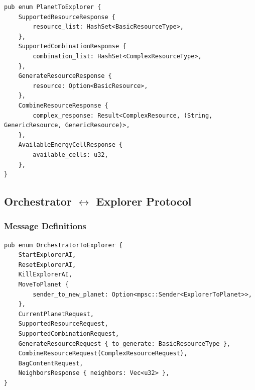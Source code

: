 \documentclass[12pt,a4paper]{article}
\begin{document}
\begin{minipage}{\textwidth}
\vspace{-7pt}

\begin{lstlisting}[style=rustcool, caption={Planet to Explorer Messages}, label=lst:planet-to-explorer]
pub enum PlanetToExplorer {
    SupportedResourceResponse {
        resource_list: HashSet<BasicResourceType>,
    },
    SupportedCombinationResponse {
        combination_list: HashSet<ComplexResourceType>,
    },
    GenerateResourceResponse {
        resource: Option<BasicResource>,
    },
    CombineResourceResponse {
        complex_response: Result<ComplexResource, (String, GenericResource, GenericResource)>,
    },
    AvailableEnergyCellResponse {
        available_cells: u32,
    },
}
\end{lstlisting}

\end{minipage}

\newpage

\subsection{Orchestrator $\leftrightarrow$ Explorer Protocol}
\label{subsec:orch-explorer-enums}

\subsubsection{Message Definitions}
\begin{lstlisting}[style=rustcool, caption={Orchestrator to Explorer Messages}, label=lst:orch-to-explorer]
pub enum OrchestratorToExplorer {
    StartExplorerAI,
    ResetExplorerAI,
    KillExplorerAI, 
    MoveToPlanet {
        sender_to_new_planet: Option<mpsc::Sender<ExplorerToPlanet>>,
    },
    CurrentPlanetRequest,
    SupportedResourceRequest,
    SupportedCombinationRequest,
    GenerateResourceRequest { to_generate: BasicResourceType },
    CombineResourceRequest(ComplexResourceRequest),
    BagContentRequest,
    NeighborsResponse { neighbors: Vec<u32> },
}
\end{lstlisting}
\end{document}
